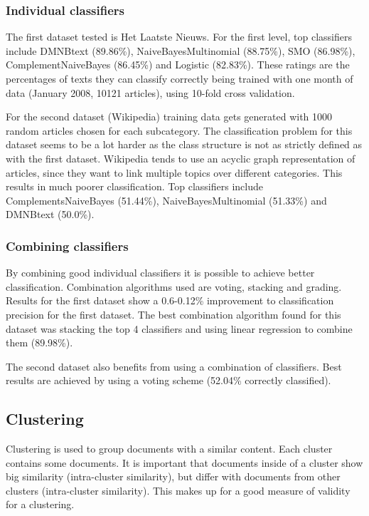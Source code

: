 \documentclass[twocolumn]{phdsymp} %
\begin{document}
\subsubsection{Individual classifiers}
The first dataset tested is Het Laatste Nieuws. For the first level, top classifiers include DMNBtext (89.86\%), NaiveBayesMultinomial (88.75\%), SMO (86.98\%), ComplementNaiveBayes (86.45\%) and Logistic (82.83\%). These ratings are the percentages of texts they can classify correctly being trained with one month of data (January 2008, 10121 articles), using 10-fold cross validation. 

For the second dataset (Wikipedia) training data gets generated with 1000 random articles chosen for each subcategory. The classification problem for this dataset seems to be a lot harder as the class structure is not as strictly defined as with the first dataset. Wikipedia tends to use an acyclic graph representation of articles, since they want to link multiple topics over different categories. This results in much poorer classification. Top classifiers include ComplementsNaiveBayes (51.44\%), NaiveBayesMultinomial (51.33\%) and DMNBtext (50.0\%).

\subsubsection{Combining classifiers}
By combining good individual classifiers it is possible to achieve better classification. Combination algorithms used are voting, stacking and grading. Results for the first dataset show a 0.6-0.12\% improvement to classification precision for the first dataset. The best combination algorithm found for this dataset was stacking the top 4 classifiers and using linear regression to combine them (89.98\%).

The second dataset also benefits from using a combination of classifiers. Best results are achieved by using a voting scheme (52.04\% correctly classified).

\subsection{Clustering}
Clustering is used to group documents with a similar content. Each cluster contains some documents. It is important that documents inside of a cluster show big similarity (intra-cluster similarity), but differ with documents from other clusters (intra-cluster similarity). This makes up for a good measure of validity for a clustering. 
\end{document}
